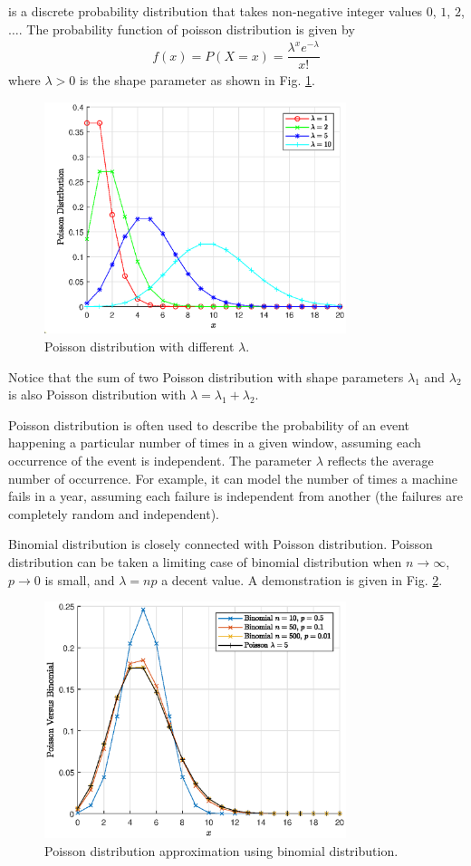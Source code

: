  is a discrete probability distribution that takes non-negative integer values $0$, $1$, $2$, $\ldots$. The probability function of poisson distribution is given by
\begin{eqnarray}
  f(x) = P(X=x) = \dfrac{\lambda^xe^{-\lambda}}{x!} \nonumber
\end{eqnarray}
where $\lambda >0$ is the shape parameter as shown in Fig. \ref{fig:poisson_pmf}.
\begin{figure}[!htb]
	\centering
	\includegraphics[width=250pt]{chapters/part-1/figures/poisson_pmf.eps}
	\caption{Poisson distribution with different $\lambda$.} \label{fig:poisson_pmf}
\end{figure}
Notice that the sum of two Poisson distribution with shape parameters $\lambda_1$ and $\lambda_2$ is also Poisson distribution with $\lambda = \lambda_1 + \lambda_2$.

Poisson distribution is often used to describe the probability of an event happening a particular number of times in a given window, assuming each occurrence of the event is independent. The parameter $\lambda$ reflects the average number of occurrence. For example, it can model the number of times a machine fails in a year, assuming each failure is independent from another (the failures are completely random and independent). 

Binomial distribution is closely connected with Poisson distribution. Poisson distribution can be taken a limiting case of binomial distribution when $n\rightarrow\infty$, $p\rightarrow 0$ is small, and $\lambda = np$ a decent value. A demonstration is given in Fig. \ref{fig:poisson_vs_b}.
\begin{figure}[!htb]
	\centering
	\includegraphics[width=250pt]{chapters/part-1/figures/poisson_vs_b.eps}
	\caption{Poisson distribution approximation using binomial distribution.} \label{fig:poisson_vs_b}
\end{figure}

